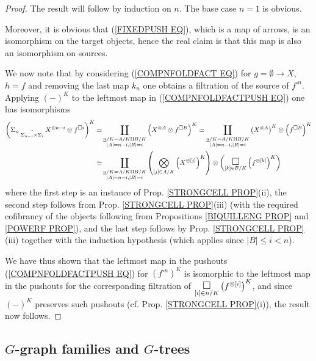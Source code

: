 \documentclass[a4paper,10pt]{article}%
\begin{document}
\begin{proof}
The result will follow by induction on $n$. The base case $n=1$ is obvious.

Moreover, it is obvious that (\ref{FIXEDPUSH EQ}), which is a map of arrows, is an isomorphism on the target objects, hence the real claim is that this map is also an isomorphism on sources.

We now note that by considering (\ref{COMPNFOLDFACT EQ}) for
$g=\emptyset \to X$, $h=f$ and removing the last map $k_n$
one obtains a filtration of the source of $f^{\square n}$.
Applying $(\minus)^K$ to the leftmost map in 
(\ref{COMPNFOLDFACTPUSH EQ})
one has isomorphisms
\begin{align*}
	\left(
	\Sigma_n \underset{\Sigma_{n-i} \times \Sigma_i}
	{\cdot} X^{\otimes n-i} \otimes f^{\square i}
	\right)^K
\simeq &
	\coprod_{\substack{\underline{n}/K=A/K \amalg B/K \\
	|A|=n-i,|B|=i}}
	\left( X^{\otimes A} \otimes f^{\square B} \right)^K
\simeq
	\coprod_{\substack{\underline{n}/K=A/K \amalg B/K \\
	|A|=n-i,|B|=i}} 
	\left( X^{\otimes A}\right)^K \otimes \left( f^{\square B} \right)^K
\\
\simeq &
	\coprod_{\substack{\underline{n}/K=A/K \amalg B/K \\
	|A|=n-i,|B|=i}} 
	\left(
	\bigotimes_{[j]\in A/K}\left( X^{\otimes [j]}\right)^K
	\right)
\otimes 
	\left(
	\underset{[k] \in B/K}
	{\mathlarger{\mathlarger{\square}}}
	\left(  f^{\otimes [k]} \right)^K
	\right)
\end{align*}
where the first step is an instance of Prop. \ref{STRONGCELL PROP}(ii), 
the second step follows from Prop. \ref{STRONGCELL PROP}(iii)
(with the required cofibrancy of the objects following from Propositions \ref{BIQUILLENG PROP} and \ref{POWERF PROP}),
and the last step follows by Prop. \ref{STRONGCELL PROP}(iii) together with the induction hypothesis (which applies since $|B|\leq i <n$).


We have thus shown that the leftmost map in the pushouts (\ref{COMPNFOLDFACTPUSH EQ}) for 
$\left( f^{\square n} \right)^K$
is isomorphic to the leftmost map in the pushouts for the corresponding filtration of 	
$\underset{[i] \in n/K}{\mathlarger{\mathlarger{\square}}}
\left( f^{\otimes [i]} \right)^K$,
and since $(\minus)^K$ preserves such pushouts (cf. Prop. \ref{STRONGCELL PROP}(i)), the result now follows.
\end{proof}


\subsection{$G$-graph families and $G$-trees}
\end{document}
